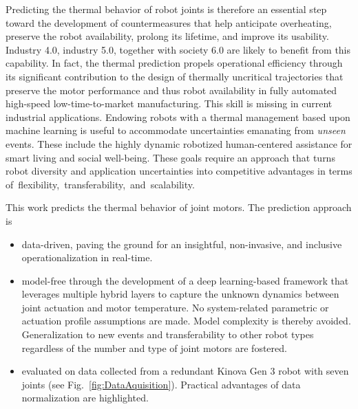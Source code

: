 \documentclass{ifacconf}
\begin{document}
Predicting the thermal behavior of robot joints is therefore an essential step toward the development of countermeasures that help anticipate overheating, preserve the robot availability,  prolong its lifetime, and improve its usability. Industry 4.0, industry 5.0, together with society 6.0 are likely to benefit from this capability. In fact, the thermal prediction propels operational efficiency through its significant contribution to the design of thermally uncritical trajectories that  preserve the motor performance and thus robot availability in fully automated high-speed low-time-to-market manufacturing. This skill is missing in current industrial applications. Endowing robots with a thermal management based upon machine learning is useful to accommodate uncertainties emanating from \textit{unseen} events. These include the highly dynamic robotized human-centered assistance for smart living and social well-being. These goals require an approach that turns robot diversity and application uncertainties into competitive advantages in terms \mbox{of flexibility,  transferability, and scalability.}

This work predicts  the thermal behavior of joint motors. The prediction approach is
\begin{itemize}
	\item data-driven, paving the ground for an  insightful, non-invasive, and inclusive operationalization in real-time. %
	\item model-free through the development of a deep learning-based framework that leverages multiple hybrid layers to capture the unknown dynamics between joint actuation and motor temperature. No system-related parametric or actuation profile assumptions are made. Model complexity is thereby avoided.  Generalization to new events and transferability to other robot types {regardless of the number and type of joint motors are fostered.}
	\item evaluated on data collected from a redundant Kinova Gen 3 robot with seven joints (see Fig.~\ref{fig:DataAquisition}). Practical advantages of data normalization are highlighted.
\end{itemize}
\end{document}
